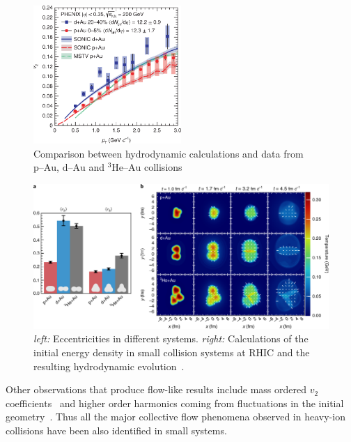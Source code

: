 \begin{figure}[htb]
\centering

		\includegraphics[width=0.5\textwidth]{figures/41567_2018_360_Fig4_HTML.png}
                \caption{Comparison between hydrodynamic calculations and data from $\mbox{p--Au}$, $\mbox{d--Au}$ and $^3\mbox{He--Au}$ collisions~\cite{PHENIX:2018lia}}
	\label{fig:smallsystems1}
\end{figure}

\begin{figure}[b!]
\centering
            	\includegraphics[width=\textwidth]{figures/PhenixNature_1.png}
	\caption{\emph{left:} Eccentricities in different systems. \emph{right:} Calculations of the initial energy density in small collision systems at RHIC and the resulting hydrodynamic evolution~\cite{PHENIX:2018lia}.}
	\label{fig:smallhydro}
	\end{figure}


Other observations that produce flow-like results include mass ordered $v_2$ coefficients~\cite{CMS:2018rfr} and higher order harmonics coming from fluctuations in the initial geometry~\cite{Acharya:2017ino}. Thus all the major collective flow phenomena observed in heavy-ion collisions have been also identified in small systems.

